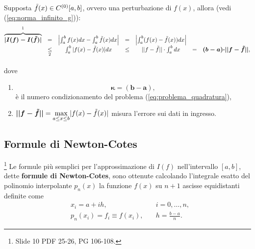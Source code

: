 \begin{definition}
    Supposta $\Tilde{f}(x)\in C^{(0)}[a,b]$, ovvero una perturbazione di $f(x)$, allora (vedi (\ref{eq:norma_infinito_g})):
    \begin{equation*}
        \begin{matrix}
            \overbrace{\boldsymbol{|I(f)-I(\Tilde{f})|}}^{\footnotemark} &=& \left|\int_{a}^{b}f(x)dx-\int_{a}^{b}\Tilde{f}(x)dx\right| &=& \left|\int_{a}^{b}(f(x)-\Tilde{f}(x))dx\right|\\
             &\underset{\footnotemark}{\leq}&\int_{a}^{b}|f(x)-\Tilde{f}(x)|dx&\leq& ||f-\Tilde{f}||\cdot\int_{a}^{b}dx &=&\boldsymbol{(b-a)\cdot}\boldsymbol{||f-\Tilde{f}||},
        \end{matrix}
    \end{equation*}
    
    \addtocounter{footnote}{-1}
    
    
    \noindent dove
    \begin{enumerate}
    	\item \begin{equation}\label{eq:numero_condizionamento_integrale}
    		\boldsymbol{\kappa=(b-a)},
    	\end{equation} 
    	è il numero condizionamento del problema (\ref{eq:problema_quadratura}),
    	\item $\boldsymbol{||f-\Tilde{f}||}=\underset{a\leq x\leq b}{\max} |f(x)-\Tilde{f}(x)|$ misura l'errore sui dati in ingresso.
    \end{enumerate}
\end{definition}

\subsection{Formule di Newton-Cotes}\label{ssec:formule_N-C}\footnote{Slide 10 PDF 25-26, PG 106-108.}
Le formule più semplici per l'approssimazione di $I(f)$ nell'intervallo $[a,b]$, dette \textbf{formule di Newton-Cotes}, sono ottenute calcolando l'integrale esatto del polinomio interpolante $p_n(x)$ la funzione $f(x)$ su $n+1$ ascisse equidistanti definite come
\begin{equation}\label{eq:condizione_ascisse_equidistanti_newton_cotes}
    \begin{matrix}
        &x_i=a+ih,&\quad i=0,\hdots,n,\\
        &p_n(x_i)=f_i \equiv f(x_i),&\quad h=\frac{b-a}{n}.
    \end{matrix}
\end{equation}

